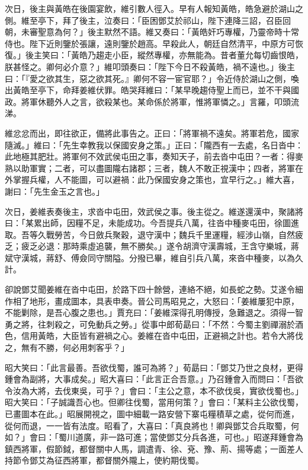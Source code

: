 次日，後主與黃皓在後園宴飲，維引數人徑入。早有人報知黃皓，皓急避於湖山之側。維至亭下，拜了後主，泣奏曰：「臣困鄧艾於祁山，陛下連降三詔，召臣回朝，未審聖意為何？」後主默然不語。維又奏曰：「黃皓奸巧專權，乃靈帝時十常侍也。陛下近則鑒於張讓，遠則鑒於趙高。早殺此人，朝廷自然清平，中原方可恢復。」後主笑曰：「黃皓乃趨走小臣，縱然專權，亦無能為。昔者董允每切齒恨皓，朕甚怪之。卿何必介意？」維叩頭奏曰：「陛下今日不殺黃皓，禍不遠也。」後主曰：「『愛之欲其生，惡之欲其死。』卿何不容一宦官耶？」令近侍於湖山之側，喚出黃皓至亭下，命拜姜維伏罪。皓哭拜維曰：「某早晚趨侍聖上而已，並不干與國政。將軍休聽外人之言，欲殺某也。某命係於將軍，惟將軍憐之。」言羅，叩頭流涕。

維忿忿而出，即往欲正，備將此事告之。正曰：「將軍禍不遠矣。將軍若危，國家隨滅。」維曰：「先生幸教我以保國安身之策。」正曰：「隴西有一去處，名日沓中：此地極其肥壯。將軍何不效武侯屯田之事，奏知天子，前去沓中屯田？一者：得麥熟以助軍實；二者，可以盡圖隴右諸郡；三者，魏人不敢正視漢中；四者，將軍在外掌握兵權，人不能圖，可以避禍：此乃保國安身之策也，宜早行之。」維大喜，謝曰：「先生金玉之言也。」

次日，姜維表奏後主，求沓中屯田，效武侯之事。後主從之。維遂還漢中，聚諸將曰：「某累出師，因糧不足，未能成功。今吾提兵八萬，往沓中種麥屯田，徐圖進取。吾等久戰勞苦，今日斂兵聚穀，退守漢中；魏兵千里運糧，經涉山嶺，自然疲乏；疲乏必退：那時乘虛追襲，無不勝矣。」遂令胡濟守漢壽城，王含守樂城，蔣斌守漢城，蔣舒、傅僉同守關隘。分撥已畢，維自引兵八萬，來沓中種麥，以為久計。

卻說鄧艾聞姜維在沓中屯田，於路下四十餘營，連絡不絕，如長蛇之勢。艾遂令細作相了地形，畫成圖本，具表申奏。晉公司馬昭見之，大怒曰：「姜維屢犯中原，不能剿除，是吾心腹之患也。」賈充曰：「姜維深得孔明傳授，急難退之。須得一智勇之將，往刺殺之，可免動兵之勞。」從事中郎荀勗曰：「不然：今蜀主劉禪溺於酒色，信用黃皓，大臣皆有避禍之心。姜維在沓中屯田，正避禍之計也。若令大將伐之，無有不勝，何必用刺客乎？」

昭大笑曰：「此言最善。吾欲伐蜀，誰可為將？」荀勗曰：「鄧艾乃世之良材，更得鍾會為副將，大事成矣。」昭大喜曰：「此言正合吾意。」乃召鍾會入而問曰：「吾欲令汝為大將，去伐東吳，可乎？」會曰：「主公之意，本不欲伐吳，實欲伐蜀也。」昭大笑曰：「子誠識吾心也。但卿往伐蜀，當用何策？」會曰：「某料主公欲伐蜀，已畫圖本在此。」昭展開視之，圖中細載一路安營下寨屯糧積草之處，從何而進，從何而退，一一皆有法度。昭看了，大喜曰：「真良將也！卿與鄧艾合兵取蜀，何如？」會曰：「蜀川道廣，非一路可進；當使鄧艾分兵各進，可也。」昭遂拜鍾會為鎮西將軍，假節鉞，都督關中人馬，調遣青、徐、兗、豫、荊、揚等處；一面差人持節令鄧艾為征西將軍，都督關外隴上，使約期伐蜀。

